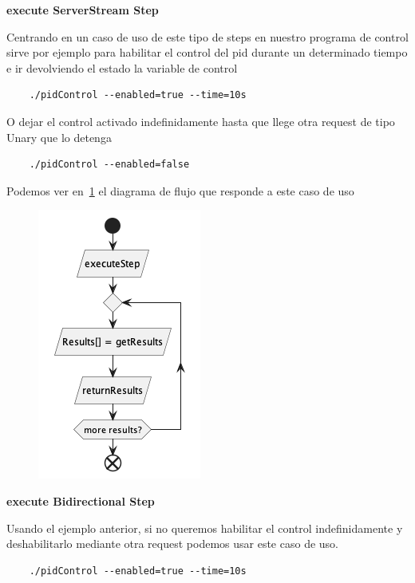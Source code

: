 \textbf{execute ServerStream Step}

Centrando en un caso de uso de este tipo de steps en nuestro programa de control sirve por ejemplo para habilitar el control del pid durante un determinado tiempo e ir devolviendo el estado la variable de control
\begin{verbatim}
    ./pidControl --enabled=true --time=10s
\end{verbatim}

O dejar el control activado indefinidamente hasta que llege otra request de tipo Unary que lo detenga

\begin{verbatim}
    ./pidControl --enabled=false
\end{verbatim}

Podemos ver en~\ref{fig:executeServerStreamStep} el diagrama de flujo que responde a este caso de uso

\begin{figure}[H]
    \centering
    \includegraphics[height=0.2\textheight]{./part/Proyecto_ejecutivo/memoria_descriptiva/descripcionDelProyecto/client/uml/executeServerStreamStep}
    \caption[Diagrama de objetos de dominio]{}\label{fig:executeServerStreamStep}
\end{figure}

\textbf{execute Bidirectional Step}

Usando el ejemplo anterior, si no queremos habilitar el control indefinidamente y deshabilitarlo mediante otra request podemos usar este caso de uso.

\begin{verbatim}
    ./pidControl --enabled=true --time=10s
\end{verbatim}


